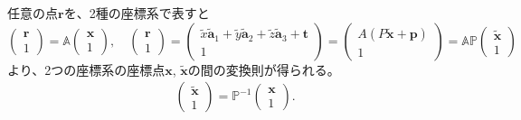 \documentclass[11pt]{easymemo}
\begin{document}
任意の点$\bm{r}$を、2種の座標系で表すと
\[
  \begin{pmatrix} \bm{r} \\  1 \end{pmatrix}
  =\mathbb{A}\begin{pmatrix} \bm{x} \\ 1 \end{pmatrix},
  \quad
  \begin{pmatrix} \bm{r} \\  1 \end{pmatrix}
  =\begin{pmatrix} \tilde{x}\widetilde{\bm{a}}_{1}+\tilde{y}\widetilde{\bm{a}}_{2}+\tilde{z}\widetilde{\bm{a}}_{3}+\bm{t} \\ 1 \end{pmatrix}
  =\begin{pmatrix} A(P\widetilde{\bm{x}}+\bm{p}) \\ 1 \end{pmatrix}
  =
  \mathbb{A}\mathbb{P}\begin{pmatrix} \widetilde{\bm{x}} \\ 1 \end{pmatrix}
\]
より、2つの座標系の座標点$\bm{x}$, $\widetilde{\bm{x}}$の間の変換則が得られる。
\begin{align}
  \begin{pmatrix} \widetilde{\bm{x}} \\ 1 \end{pmatrix}=\mathbb{P}^{-1}\begin{pmatrix} \bm{x} \\ 1 \end{pmatrix}.
\end{align}
\end{document}
